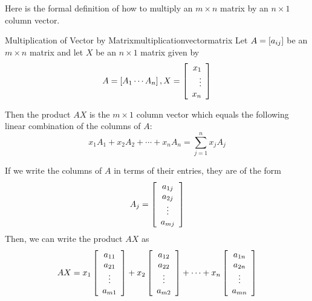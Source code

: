 Here is the formal definition of how to multiply an $m\times
n $ matrix by an $ n\times 1 $ column vector.

\begin{definition}{Multiplication of Vector by Matrix}{multiplicationvectormatrix}
Let $A=\left[ a_{ij} \right]$ be an $m\times n$ matrix and let $X$
be an $n\times 1$ matrix given by 
\begin{equation*}
A=\left[ A_{1} \cdots A_{n}\right],  X = \left[
\begin{array}{r}
x_{1} \\
\vdots \\
x_{n}
\end{array}
\right] 
\end{equation*}

Then the product $AX$ is the $m\times 1$ column
vector
which equals the following
linear combination of the columns of $A$:
\begin{equation*}
x_{1}A_{1}+x_{2}A_{2}+\cdots +x_{n}A_{n} = 
\sum_{j=1}^{n}x_{j}A_{j}  
\end{equation*}
\end{definition}

If we write the columns of $A$ in terms of their entries, they are of the form
\begin{equation*}
A_{j}  =
\left[
\begin{array}{c}
a_{1j} \\
a_{2j} \\
\vdots \\
a_{mj}
\end{array}
\right] 
\end{equation*}
Then, we can write the product $AX$ as
\begin{equation*}
AX = 
x_{1}\left[
\begin{array}{c}
a_{11} \\
a_{21} \\
\vdots \\
a_{m1}
\end{array}
\right] + x_{2}\left[
\begin{array}{c}
a_{12} \\
a_{22} \\
\vdots \\
a_{m2}
\end{array}
\right] +\cdots + x_{n}\left[
\begin{array}{c}
a_{1n} \\
a_{2n} \\
\vdots \\
a_{mn}
\end{array}
\right] 
\end{equation*}

